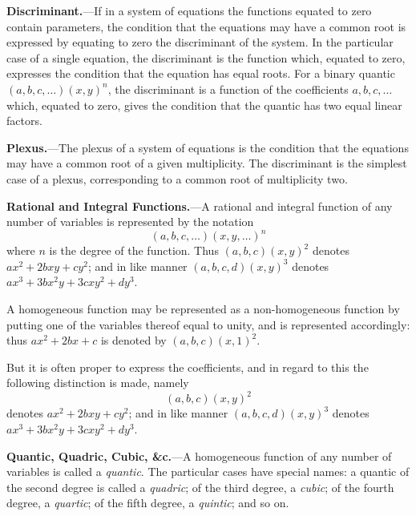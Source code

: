 \documentclass[12pt,a4paper]{article}
\theoremstyle{definition}
\begin{document}
\vspace{1em}

\noindent\textbf{Discriminant.}---If in a system of equations the functions equated to zero contain parameters, the condition that the equations may have a common root is expressed by equating to zero the discriminant of the system. In the particular case of a single equation, the discriminant is the function which, equated to zero, expresses the condition that the equation has equal roots. For a binary quantic $(a, b, c, \ldots)(x, y)^n$, the discriminant is a function of the coefficients $a, b, c, \ldots$ which, equated to zero, gives the condition that the quantic has two equal linear factors.

\vspace{1em}

\noindent\textbf{Plexus.}---The plexus of a system of equations is the condition that the equations may have a common root of a given multiplicity. The discriminant is the simplest case of a plexus, corresponding to a common root of multiplicity two.

\vspace{1em}

\noindent\textbf{Rational and Integral Functions.}---A rational and integral function of any number of variables is represented by the notation
\[
(a, b, c, \ldots)(x, y, \ldots)^n
\]
where $n$ is the degree of the function. Thus $(a, b, c)(x, y)^2$ denotes $ax^2 + 2bxy + cy^2$; and in like manner $(a, b, c, d)(x, y)^3$ denotes $ax^3 + 3bx^2y + 3cxy^2 + dy^3$.

A homogeneous function may be represented as a non-homogeneous function by putting one of the variables thereof equal to unity, and is represented accordingly: thus $ax^2 + 2bx + c$ is denoted by $(a, b, c)(x, 1)^2$.

But it is often proper to express the coefficients, and in regard to this the following distinction is made, namely
\[
(a, b, c)(x, y)^2
\]
denotes $ax^2 + 2bxy + cy^2$; and in like manner $(a, b, c, d)(x, y)^3$ denotes $ax^3 + 3bx^2y + 3cxy^2 + dy^3$.

\vspace{1em}

\noindent\textbf{Quantic, Quadric, Cubic, \&c.}---A homogeneous function of any number of variables is called a \textit{quantic}. The particular cases have special names: a quantic of the second degree is called a \textit{quadric}; of the third degree, a \textit{cubic}; of the fourth degree, a \textit{quartic}; of the fifth degree, a \textit{quintic}; and so on.
\end{document}
